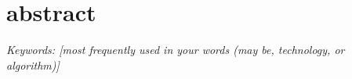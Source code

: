 \chapter*{abstract}

\lipsum[8]

\lipsum[10]

\noindent\textit{Keywords: [most frequently used in your words (may be, technology, or algorithm)]}
\newpage
